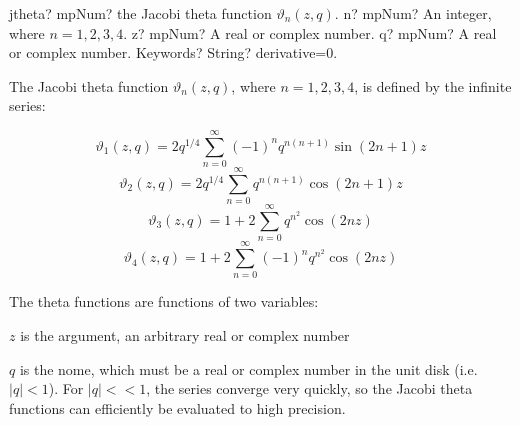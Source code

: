 %
%
%
%
%
%
%



\begin{mpFunctionsExtract}
	\mpFunctionFour
	{jtheta? mpNum? the Jacobi theta function $\vartheta_n(z,q)$.}
	{n? mpNum? An integer, where $n=1,2,3,4$.}	
	{z? mpNum? A real or complex number.}
	{q? mpNum? A real or complex number.}
	{Keywords? String? derivative=0.}		
\end{mpFunctionsExtract}

\vpara
The Jacobi theta function $\vartheta_n(z,q)$, where $n=1,2,3,4$, is defined by the infinite series:

\begin{equation}
\vartheta_1(z,q) = 2q^{1/4} \sum_{n=0}^\infty (-1)^n q^{n(n+1)} \sin(2n+1) z
\end{equation}
\begin{equation}
\vartheta_2(z,q) = 2q^{1/4} \sum_{n=0}^\infty q^{n(n+1)} \cos(2n+1) z
\end{equation}
\begin{equation}
\vartheta_3(z,q) = 1 + 2\sum_{n=0}^\infty q^{n^2} \cos(2nz)
\end{equation}
\begin{equation}
\vartheta_4(z,q) = 1 + 2\sum_{n=0}^\infty (-1)^n q^{n^2} \cos(2nz)
\end{equation}


The theta functions are functions of two variables:

\vpara
$z$ is the argument, an arbitrary real or complex number

$q$ is the nome, which must be a real or complex number in the unit disk (i.e. $|q|<1$). For $|q|<< 1$, the series converge very quickly, so the Jacobi theta functions can efficiently be evaluated to high precision.

